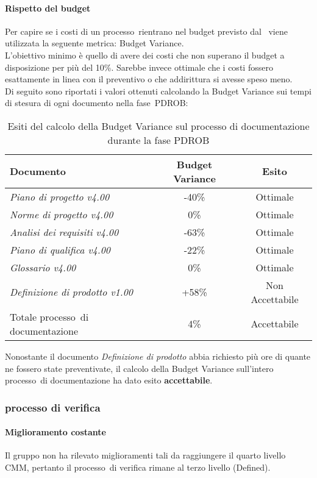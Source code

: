 \documentclass[../PianoDiQualifica.tex]{subfiles}
\begin{document}
\begin{appendices}
			\paragraph{Rispetto del budget}
			Per capire se i costi di un processo\g\ rientrano nel budget previsto dal \pianodiprogetto\ viene utilizzata la seguente metrica: Budget Variance.\\
			L'obiettivo minimo è quello di avere dei costi che non superano il budget a disposizione per più del 10\%. Sarebbe invece ottimale che i costi fossero esattamente in linea con il preventivo o che addirittura si avesse speso meno.\\
			Di seguito sono riportati i valori ottenuti calcolando la Budget Variance sui tempi di stesura di ogni documento nella fase\g\ PDROB:
			\begin{table}[H]
				\centering
				\begin{tabular}{l * {2}{c}}
					\toprule
					\textbf{Documento} & \textbf{Budget Variance} & \textbf{Esito} \\
					\midrule
					\textit{Piano di progetto v4.00} & -40\% &  Ottimale \\
					\textit{Norme di progetto v4.00} & 0\% & Ottimale \\
					\textit{Analisi dei requisiti v4.00} & -63\% & Ottimale \\
					\textit{Piano di qualifica v4.00} & -22\% & Ottimale \\
					\textit{Glossario v4.00} & 0\% & Ottimale \\
					\textit{Definizione di prodotto v1.00} & +58\% & Non Accettabile \\
					Totale processo\g\ di documentazione & 4\% & Accettabile \\
					\bottomrule
				\end{tabular}
				\caption{Esiti del calcolo della Budget Variance sul processo di documentazione durante la fase PDROB}
				\label{tab:esiti_budget_variance}
			\end{table}
			Nonostante il documento \textit{Definizione di prodotto} abbia richiesto più ore di quante ne fossero state preventivate, il calcolo della Budget Variance sull'intero processo\g\ di documentazione ha dato esito \textbf{accettabile}.
						
		\subsubsection{processo di verifica}
			\paragraph{Miglioramento costante}
			Il gruppo non ha rilevato miglioramenti tali da raggiungere il quarto livello CMM\g, pertanto il processo\g\ di verifica rimane al terzo livello (Defined).
			

\end{appendices}
\end{document}

